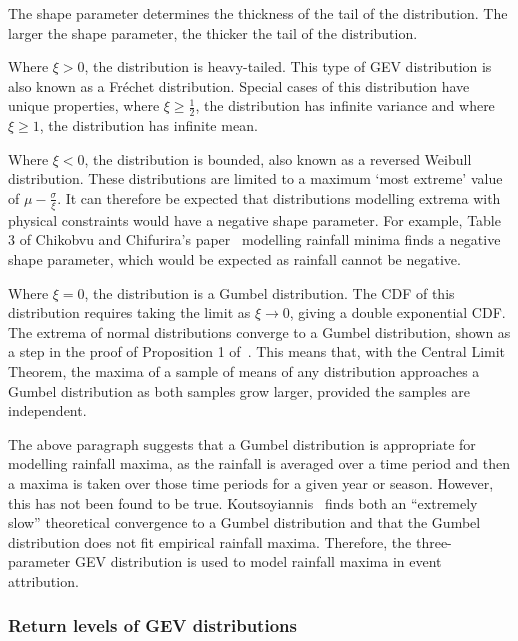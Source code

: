 \documentclass[12pt,a4paper]{report}
\begin{document}
The shape parameter determines the thickness of the tail of the distribution.
The larger the shape parameter, the thicker the tail of the distribution.


Where $\xi > 0$,
    the distribution is heavy-tailed.
This type of GEV distribution is also known as a Fr\'{e}chet distribution.
Special cases of this distribution have unique properties,
    where $\xi \geq \frac{1}{2}$, the distribution has infinite variance and
    where $\xi \geq 1$, the distribution has infinite mean.

Where $\xi < 0$, the distribution is bounded,
    also known as a reversed Weibull distribution.
These distributions are limited to a maximum `most extreme' value of $\mu - \frac{\sigma}{\xi}$.
It can therefore be expected that distributions modelling extrema with physical constraints would have a negative shape parameter.
For example, Table 3 of Chikobvu and Chifurira's paper~\cite{Chikobvu_2015} modelling rainfall minima finds a negative shape parameter,
    which would be expected as rainfall cannot be negative.

Where $\xi = 0$,
    the distribution is a Gumbel distribution.
The CDF of this distribution requires taking the limit as $\xi \rightarrow 0$,
    giving a double exponential CDF\@.
The extrema of normal distributions converge to a Gumbel distribution,
    shown as a step in the proof of Proposition 1 of~\cite{Bailey_2014}.
This means that, with the Central Limit Theorem,
    the maxima of a sample of means of any distribution approaches a Gumbel distribution as both samples grow larger,
    provided the samples are independent.

The above paragraph suggests that a Gumbel distribution is appropriate for modelling rainfall maxima,
    as the rainfall is averaged over a time period and then a maxima is taken over those time periods for a given year or season.
However, this has not been found to be true.
Koutsoyiannis~\cite{Koutsoyiannis_2003} finds both an ``extremely slow'' theoretical convergence to a Gumbel distribution and
    that the Gumbel distribution does not fit empirical rainfall maxima.
Therefore, the three-parameter GEV distribution is used to model rainfall maxima in event attribution.

\subsubsection{Return levels of GEV distributions}
\end{document}
